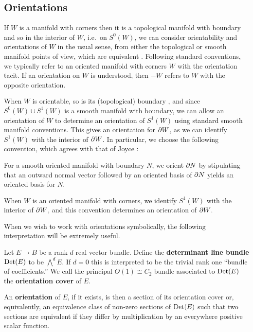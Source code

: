 \subsection{Orientations}\label{S: orientations}

If $W$ is a manifold with corners then it is a topological manifold with boundary and so in the interior of $W$, i.e.\ on $S^0(W)$, we can consider orientability and orientations of $W$ in the usual sense, from either the topological or smooth manifold points of view, which are equivalent \cite[Theorem VI.7.15]{Bred97}.
Following standard conventions, we typically refer to an oriented manifold with corners $W$ with the orientation tacit.
If an orientation on $W$ is understood, then $-W$ refers to $W$ with the opposite orientation.

When $W$ is orientable, so is its (topological) boundary \cite[Lemma 6.9.1]{Bred97}, and since $S^0(W) \cup S^1(W)$ is a smooth manifold with boundary, we can allow an orientation of $W$ to determine an orientation of $S^1(W)$ using standard smooth manifold conventions.
This gives an orientation for $\partial W$, as we can identify $S^1(W)$ with the interior of $\partial W$.
In particular, we choose the following convention, which agrees with that of Joyce \cite[Convention 7.2.a]{Joy12}:

\begin{convention}\label{Con: oriented boundary}
	For a smooth oriented manifold with boundary $N$, we orient $\partial N$ by stipulating that an outward normal vector followed by an oriented basis of $\partial N$ yields an oriented basis for $N$.

	When $W$ is an oriented manifold with corners, we identify $S^1(W)$ with the interior of $\partial W$, and this convention determines an orientation of $\partial W$.
\end{convention}

When we wish to work with orientations symbolically, the following interpretation will be extremely useful.

\begin{definition}\label{D: det bundle}
	Let $E \to B$ be a rank $d$ real vector bundle.
	Define the \textbf{determinant line bundle}
	${\rm Det}(E)$ to be $\bigwedge^d E$.
	If $d = 0$ this is interpreted to be the trivial rank one ``bundle of coefficients.''
	We call the principal $O(1) \cong C_2$ bundle associated to ${\rm Det}(E)$ the \textbf{orientation cover} of $E$.

	An \textbf{orientation} of $E$, if it exists, is then a section of its orientation cover or, equivalently, an equivalence class of non-zero sections of ${\rm Det}(E)$ such that two sections are equivalent if they differ by multiplication by an everywhere positive scalar function.
\end{definition}

